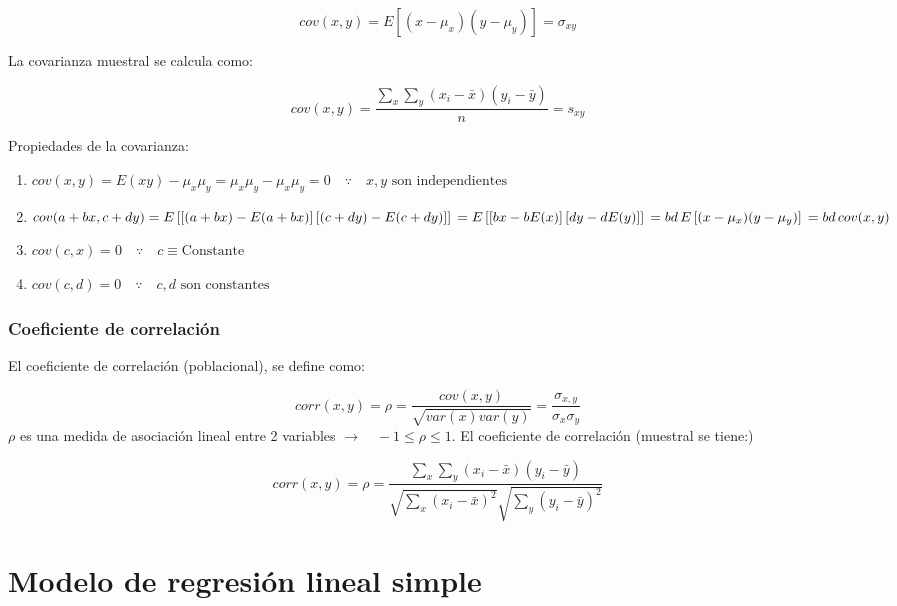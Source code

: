 \documentclass[
]{book}
\providecommand{\tightlist}{%
  \setlength{\itemsep}{0pt}\setlength{\parskip}{0pt}}
\begin{document}
\[
cov(x,y) = E[(x-\mu_x)(y-\mu_y)] = \sigma_{xy}
\]

La covarianza muestral se calcula como:

\[
cov(x,y) = \frac{\sum_x \sum_y (x_i - \bar x)(y_i - \bar y)}{n} = s_{xy}
\]

Propiedades de la covarianza:

\begin{enumerate}
\def\labelenumi{\arabic{enumi}.}
\tightlist
\item
  \(cov(x,y) = E(xy) - \mu_x \mu_y = \mu_x \mu_y - \mu_x \mu_y = 0 \quad \because \quad x,y \text{ son independientes}\)
\item
  \(cov(a+bx, c+dy) = E\left[ \left[(a+bx) - E(a+bx)\right]\left[(c+dy) - E(c+dy)\right] \right] \\ = E\left[ \left[ bx - bE(x) \right]\left[ dy - dE(y) \right] \right] \\ = bd \, E\left[(x-\mu_{x})(y-\mu_{y})\right] \\ = bd \, cov(x, y)\)
\item
  \(cov(c,x) = 0 \quad \because \quad c \equiv \text{Constante}\)
\item
  \(cov(c,d) = 0 \quad \because \quad c,d \text{ son constantes}\)
\end{enumerate}

\hypertarget{coeficiente-de-correlaciuxf3n}{%
\subsection{Coeficiente de correlación}\label{coeficiente-de-correlaciuxf3n}}

El coeficiente de correlación (poblacional), se define como:

\[
corr(x,y) = \rho = \frac{cov(x,y)}{\sqrt{var(x)var(y)}} = \frac{\sigma_{x,y}}{\sigma_x \sigma_y}
\]
\(\rho\) es una medida de asociación lineal entre 2 variables \(\rightarrow \quad -1 \leq \rho \leq 1\).
El coeficiente de correlación (muestral se tiene:)

\[
corr(x,y) = \rho =  \frac{\sum_x \sum_y (x_i - \bar x)(y_i - \bar y)}{\sqrt{\sum_x (x_i - \bar x)^2} \sqrt{\sum_y(y_i - \bar y)^2}}
\]

\hypertarget{modelo-de-regresiuxf3n-lineal-simple}{%
\chapter{Modelo de regresión lineal simple}\label{modelo-de-regresiuxf3n-lineal-simple}}
\end{document}
